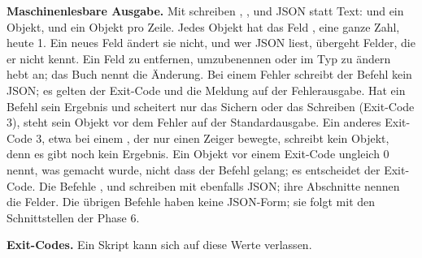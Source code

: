 {\bf Maschinenlesbare Ausgabe.} Mit  schreiben , ,
 und  JSON statt Text:  und  ein Objekt,
 und  ein Objekt pro Zeile.
Jedes Objekt hat das Feld , eine ganze Zahl, heute 1.
Ein neues Feld ändert sie nicht, und wer JSON liest, übergeht Felder, die er nicht kennt.
Ein Feld zu entfernen, umzubenennen oder im Typ zu ändern hebt  an;
das Buch nennt die Änderung.
Bei einem Fehler schreibt der Befehl kein JSON; es gelten der Exit-Code
und die Meldung auf der Fehlerausgabe.
Hat ein Befehl sein Ergebnis und scheitert nur das Sichern oder das Schreiben (Exit-Code 3),
steht sein Objekt vor dem Fehler auf der Standardausgabe.
Ein anderes Exit-Code 3, etwa bei einem , der nur einen Zeiger bewegte,
schreibt kein Objekt, denn es gibt noch kein Ergebnis.
Ein Objekt vor einem Exit-Code ungleich 0 nennt, was gemacht wurde, nicht dass der Befehl
gelang; es entscheidet der Exit-Code.
Die Befehle ,  und  schreiben mit  ebenfalls
JSON; ihre Abschnitte nennen die Felder.
Die übrigen Befehle haben keine JSON-Form; sie folgt mit den Schnittstellen der Phase 6.

{\bf Exit-Codes.} Ein Skript kann sich auf diese Werte verlassen.

